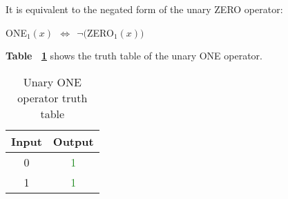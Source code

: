 \documentclass[]{usiinfbachelorproject}
\begin{document}
\begin{itemize}
        It is equivalent to the negated form of the unary ZERO operator:
        \begin{center}
            ONE$_1(x) \ \ \Longleftrightarrow \ \ \neg($ZERO$_1(x))$
        \end{center}
        \textbf{Table ~\ref{tab:one-unary-table}} shows the truth table of the unary ONE operator.
        \begin{table}[H]
            \centering
            \begin{tabular}{|c|c|}
                \hline
                \textbf{Input} & \textbf{Output} \\
                \hline
                0 & \textcolor{ForestGreen}{1} \\
                \hline
                1 & \textcolor{ForestGreen}{1} \\
                \hline
            \end{tabular}
            \caption{Unary ONE operator truth table}
            \label{tab:one-unary-table}
        \end{table}
\end{itemize}
\end{document}
